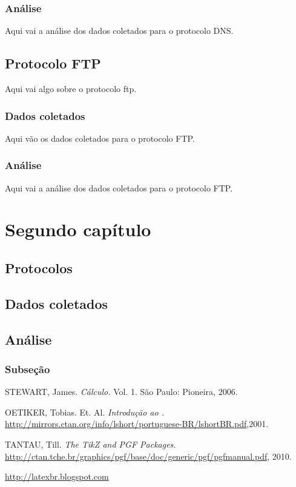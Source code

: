 \documentclass[a4paper]{report} %
\begin{document}
\subsection{Análise}
\label{sub_dns_analise}
Aqui vai a análise dos dados coletados para o protocolo DNS.

\section{Protocolo FTP}
\label{sec_ftp}
Aqui vai algo sobre o protocolo ftp.
\subsection{Dados coletados}
\label{sub_ftp_dados}
Aqui vão os dados coletados para o protocolo FTP.

\subsection{Análise}
\label{sub_ftp_analise}
Aqui vai a análise dos dados coletados para o protocolo FTP.

\chapter{Segundo capítulo}
\label{chap_segundo}

\section{Protocolos}
\label{sec_segundo_protocolos}

\section{Dados coletados}
\label{sec_segundo}

\section{Análise}
\label{sec_segundo}

\subsection{Subseção}
\label{subsec_nome}



\begin{thebibliography}{99}
 STEWART, James. {\sl C\'alculo.} Vol. 1. S\~ao Paulo: Pioneira, 2006.

OETIKER, Tobias. Et. Al. {\sl Introdu\c c\~ao ao {\LaTeXe}.}
\url{http://mirrors.ctan.org/info/lshort/portuguese-BR/lshortBR.pdf},2001.

TANTAU, Till. {\sl The TikZ and PGF Packages.}
\url{http://ctan.tche.br/graphics/pgf/base/doc/generic/pgf/pgfmanual.pdf}, 2010.

\url{http://latexbr.blogspot.com}
\end{thebibliography}

\end{document}
